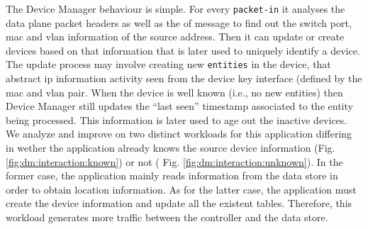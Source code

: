 \documentclass[12pt,openright,twoside]{report}
\begin{document}
\begin{figure}[ht]
\TopFloatBoxes
\begin{floatrow}

\end{floatrow}
\end{figure}

The Device Manager behaviour is simple. 
For every \texttt{packet-in} it analyses the data plane packet headers as well as the \gls{of} message to find out the switch port, \gls{mac} and \gls{vlan} information of the source address. 
Then it can update or create devices based on that information that is later used to uniquely identify a device. 
The update process may involve creating new \texttt{entities} in the device, that abstract \gls{ip} information activity seen from the device key interface (defined by the \gls{mac} and \gls{vlan} pair. 
When the device is well known (i.e., no new entities) then Device Manager still updates the ``last seen'' timestamp associated to the entity being processed. This information is later used to age out the inactive devices. 
We analyze and improve on two distinct workloads for this application differing in wether the application already knows the source device information (Fig. \ref{fig:dm:interaction:known}) or not ( Fig. \ref{fig:dm:interaction:unknown}). 
In the former case, the application mainly reads information from the data store in order to obtain location information. 
As for the latter case, the application must create the device information and update all the existent tables. 
Therefore, this workload generates more traffic between the controller and the data store.
\end{document}
